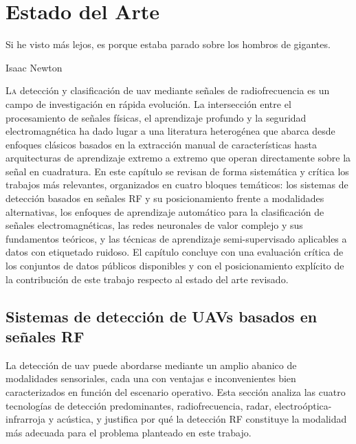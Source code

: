 
\chapter{Estado del Arte}
\label{cap:EstadoDelArte}

\epigraph{Si he visto más lejos, es porque estaba parado sobre los hombros de gigantes.}{Isaac Newton}

\lettrine[lraise=-0.1, lines=2, loversize=0.2]{L}{a} detección y clasificación de
\gls{uav} mediante señales de radiofrecuencia es un campo de investigación en rápida
evolución. La intersección entre el procesamiento de señales físicas, el aprendizaje
profundo y la seguridad electromagnética ha dado lugar a una literatura heterogénea
que abarca desde enfoques clásicos basados en la extracción manual de características
hasta arquitecturas de aprendizaje extremo a extremo que operan directamente sobre
la señal en cuadratura. En este capítulo se revisan de forma sistemática y crítica
los trabajos más relevantes, organizados en cuatro bloques temáticos: los sistemas
de detección basados en señales RF y su posicionamiento frente a modalidades
alternativas, los enfoques de aprendizaje automático para la clasificación de señales
electromagnéticas, las redes neuronales de valor complejo y sus fundamentos teóricos,
y las técnicas de aprendizaje semi-supervisado aplicables a datos con etiquetado
ruidoso. El capítulo concluye con una evaluación crítica de los conjuntos de datos
públicos disponibles y con el posicionamiento explícito de la contribución de este
trabajo respecto al estado del arte revisado.

\section{Sistemas de detección de UAVs basados en señales RF}
\label{sec:sistemas_deteccion_rf}

La detección de \gls{uav} puede abordarse mediante un amplio abanico de modalidades
sensoriales, cada una con ventajas e inconvenientes bien caracterizados en función
del escenario operativo. Esta sección analiza las cuatro tecnologías de detección
predominantes, radiofrecuencia, radar, electroóptica-infrarroja y acústica, y
justifica por qué la detección RF constituye la modalidad más adecuada para el
problema planteado en este trabajo.

